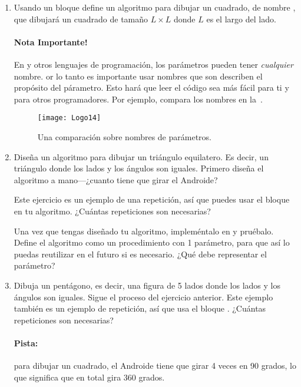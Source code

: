 \begin{enumerate}

\item Usando un bloque  define un algoritmo para
  dibujar un cuadrado, de nombre , que
  dibujará un cuadrado de tamaño $L \times L$ donde $L$ es el largo
  del lado.

\paragraph{Nota Importante!} En \AppInventor y otros lenguajes de
programación, los parámetros pueden tener \emph{cualquier} nombre. or
lo tanto es importante usar nombres que son describen el propósito del
párametro. Esto hará que leer el código sea más fácil para ti y para
otros programadores. Por ejemplo, compara los nombres en
la~.

\begin{figure}[H]
  \centering
  \texttt{[image: Logo14]}
  \caption{Una comparación sobre nombres de parámetros.}
  \label{fig:Logo14}
\end{figure}

\item Diseña un algoritmo para dibujar un triángulo equilatero. Es
  decir, un triángulo donde los lados y los ángulos son
  iguales. Primero diseña el algoritmo a mano---¿cuanto tiene que girar
  el Androide?

  Este ejercicio es un ejemplo de una repetición, así que puedes usar
  el bloque  en tu algoritmo. ¿Cuántas repeticiones
  son necesarias?

  Una vez que tengas diseñado tu algoritmo, impleméntalo en
  \AppInventor y pruébalo. Define el algoritmo como un procedimiento
  con 1 parámetro, para que así lo puedas reutilizar en el futuro si es
  necesario. ¿Qué debe representar el parámetro?

\item Dibuja un pentágono, es decir, una figura de 5 lados donde los
  lados y los ángulos son iguales. Sigue el proceso del ejercicio
  anterior. Este ejemplo también es un ejemplo de repetición, así que
  usa el bloque . ¿Cuántas repeticiones son
  necesarias?

\paragraph{Pista:} para dibujar un cuadrado, el Androide tiene que
girar 4 veces en 90 grados, lo que significa que en total gira 360
grados.


\end{enumerate}
